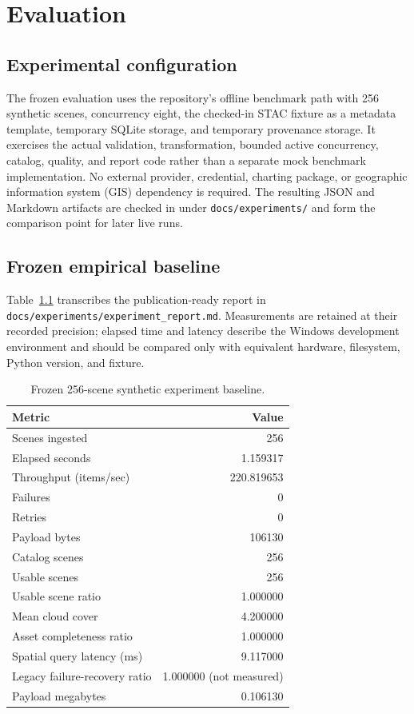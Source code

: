 \chapter{Evaluation}

\section{Experimental configuration}

The frozen evaluation uses the repository's offline benchmark path with 256 synthetic scenes,
concurrency eight, the checked-in STAC fixture as a metadata template, temporary SQLite storage,
and temporary provenance storage. It exercises the actual validation, transformation,
bounded active concurrency, catalog, quality, and report code rather than a separate mock benchmark
implementation. No external provider, credential, charting package, or geographic information
system (GIS) dependency is
required. The resulting JSON and Markdown artifacts are checked in under
\texttt{docs/experiments/} and form the comparison point for later live runs.

\section{Frozen empirical baseline}

Table~\ref{tab:baseline} transcribes the publication-ready report in
\nolinkurl{docs/experiments/experiment_report.md}. Measurements are retained at their recorded
precision; elapsed time and latency describe the Windows development environment and should be
compared only with equivalent hardware, filesystem, Python version, and fixture.

\begin{table}[htbp]
\centering
\caption{Frozen 256-scene synthetic experiment baseline.}
\label{tab:baseline}
\begin{tabular}{lr}
\toprule
Metric & Value \\
\midrule
Scenes ingested & 256 \\
Elapsed seconds & 1.159317 \\
Throughput (items/sec) & 220.819653 \\
Failures & 0 \\
Retries & 0 \\
Payload bytes & 106130 \\
Catalog scenes & 256 \\
Usable scenes & 256 \\
Usable scene ratio & 1.000000 \\
Mean cloud cover & 4.200000 \\
Asset completeness ratio & 1.000000 \\
Spatial query latency (ms) & 9.117000 \\
Legacy failure-recovery ratio & 1.000000 (not measured) \\
Payload megabytes & 0.106130 \\
\bottomrule
\end{tabular}
\end{table}

